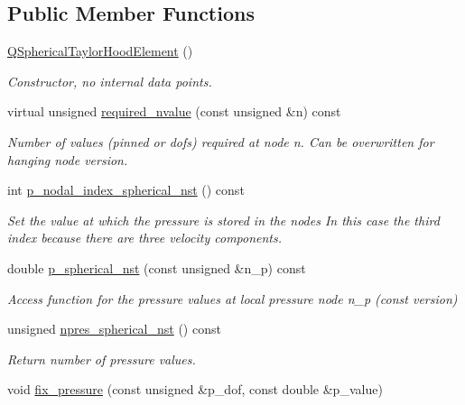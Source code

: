\subsection*{Public Member Functions}
\begin{DoxyCompactItemize}
\item 
\hyperlink{classoomph_1_1QSphericalTaylorHoodElement_a03608ea537e37018e0894260ebc83b65}{Q\+Spherical\+Taylor\+Hood\+Element} ()
\begin{DoxyCompactList}\small\item\em Constructor, no internal data points. \end{DoxyCompactList}\item 
virtual unsigned \hyperlink{classoomph_1_1QSphericalTaylorHoodElement_a900be4fc6f5710905e8f562ca5a76c3d}{required\+\_\+nvalue} (const unsigned \&n) const
\begin{DoxyCompactList}\small\item\em Number of values (pinned or dofs) required at node n. Can be overwritten for hanging node version. \end{DoxyCompactList}\item 
int \hyperlink{classoomph_1_1QSphericalTaylorHoodElement_a8d7e127d0989233ad2bcd417536b54c0}{p\+\_\+nodal\+\_\+index\+\_\+spherical\+\_\+nst} () const
\begin{DoxyCompactList}\small\item\em Set the value at which the pressure is stored in the nodes In this case the third index because there are three velocity components. \end{DoxyCompactList}\item 
double \hyperlink{classoomph_1_1QSphericalTaylorHoodElement_a0baaa4667b08a35ccb6f655fc55e63ac}{p\+\_\+spherical\+\_\+nst} (const unsigned \&n\+\_\+p) const
\begin{DoxyCompactList}\small\item\em Access function for the pressure values at local pressure node n\+\_\+p (const version) \end{DoxyCompactList}\item 
unsigned \hyperlink{classoomph_1_1QSphericalTaylorHoodElement_af923b447673c5a89772989e91d8f6603}{npres\+\_\+spherical\+\_\+nst} () const
\begin{DoxyCompactList}\small\item\em Return number of pressure values. \end{DoxyCompactList}\item 
void \hyperlink{classoomph_1_1QSphericalTaylorHoodElement_acc320cd97d3adae63e1775f24f63efe7}{fix\+\_\+pressure} (const unsigned \&p\+\_\+dof, const double \&p\+\_\+value)

\end{DoxyCompactItemize}
